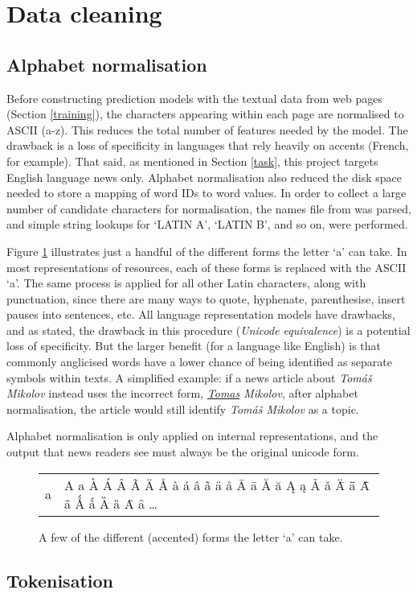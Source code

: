 \section{Data cleaning\label{clean}}
\subsection{Alphabet normalisation}
Before constructing prediction models with
the textual data from web pages (Section \ref{training}), the
characters appearing within each page are normalised to
ASCII (a-z).  This reduces the total number of features needed
by the model. The drawback  is a loss of specificity in
languages that rely heavily on accents (French, for example).
That said, as mentioned in Section \ref{task}, this project targets
English language news only.
Alphabet normalisation also reduced the disk space needed to store a
mapping of word IDs to word values.  In order to collect a large
number of candidate characters for normalisation, the names file from
 was parsed, and simple string lookups for `LATIN A',
`LATIN B', and so on, were performed.

Figure \ref{alpha} illustrates just a handful of
the different forms the letter `a' can take.  In most representations
of resources, each of these forms is replaced with the
ASCII `a'.  The same process is applied for all other Latin characters,
along with punctuation, since there are many ways to quote, hyphenate,
parenthesise, insert pauses into sentences, etc.  All language
representation models have drawbacks, and as stated, the drawback in
this procedure ({\it Unicode equivalence}) is a potential loss
of specificity.  But the larger benefit (for a language like English)
is that commonly anglicised words have a lower chance of being
identified as separate symbols within texts.  A simplified example: if
a news article about {\it Tomáš Mikolov} instead uses the incorrect
form, {\it \underline{Tomas} Mikolov}, after alphabet normalisation,
the article would still identify {\it Tomáš Mikolov} as a topic.

Alphabet normalisation is only applied on internal representations,
and the output that news readers see must always be the original
unicode form.

\begin{figure}
    \centering
    \begin{tabular}{l|l}
        a & A a À Á Â Ã Ä Å à á â ã ä å Ā ā Ă ă Ą ą Ǎ ǎ Ǟ ǟ Ǡ ǡ Ǻ ǻ Ȁ ȁ Ȃ ȃ \ldots
    \end{tabular}
    \caption{A few of the different (accented) forms the letter `a' can take.}
    \label{alpha}
\end{figure}


\subsection{Tokenisation}
